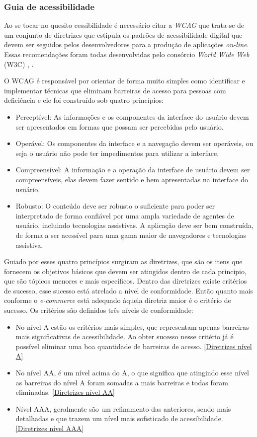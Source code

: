 \subsubsection{Guia de acessibilidade}
{
Ao se tocar no quesito cessibilidade é necessário citar a \textit{WCAG} que trata-se de um conjunto de diretrizes que estipula os padrões de acessibilidade digital que devem ser seguidos pelos desenvolvedores para a produção de aplicações \textit{on-line}. Essas recomendações foram todas desenvolvidas pelo consórcio \textit{World Wide Web} (W3C) \cite{W3C}, .

O WCAG é responsável por orientar de forma muito simples como identificar e implementar técnicas que eliminam barreiras de acesso para pessoas com deficiência e ele foi construído sob quatro princípios:
\begin{itemize}
\item Perceptível: As informações e os componentes da interface do usuário devem ser apresentados em formas que possam ser percebidas pelo usuário.
\item Operável: Os componentes da interface e a navegação devem ser operáveis, ou seja o usuário não pode ter impedimentos para utilizar a interface.
\item Compreensível: A informação e a operação da interface de usuário devem ser compreensíveis, elas devem fazer sentido e bem apresentadas na interface do usuário. 
\item Robusto: O conteúdo deve ser robusto o suficiente para poder ser interpretado de forma confiável por uma ampla variedade de agentes de usuário, incluindo tecnologias assistivas. A aplicação deve ser bem construída, de forma a ser acessível para uma gama maior de navegadores e tecnologias assistiva.
\end{itemize}

Guiado por esses quatro princípios surgiram as diretrizes, que são os itens que fornecem os objetivos básicos que devem ser atingidos dentro de cada principio, que são tópicos menores e mais específicos. Dentro das diretrizes existe critérios de sucesso, esse sucesso está atrelado a nível de conformidade. Então quanto mais conforme o \textit{e-commerce} está adequado àquela diretriz maior é o critério de sucesso. Os critérios são definidos três níveis de conformidade:
\begin{itemize}
    \item No nível A estão os critérios mais simples, que representam apenas barreiras mais significativas de acessibilidade. Ao obter sucesso nesse critério já é possível eliminar uma boa quantidade de barreiras de acesso. \ref{Diretrizes nível A}
    \item No nível AA, é um nível acima do A, o que significa que atingindo esse nível as barreiras do nível A foram somadas a mais barreiras e todas foram eliminadas. \ref{Diretrizes nível AA}
    \item Nível AAA, geralmente são um refinamento das anteriores, sendo mais detalhadas e que trazem um nível mais sofisticado de acessibilidade.  \ref{Diretrizes nível AAA}
\end{itemize}

}
